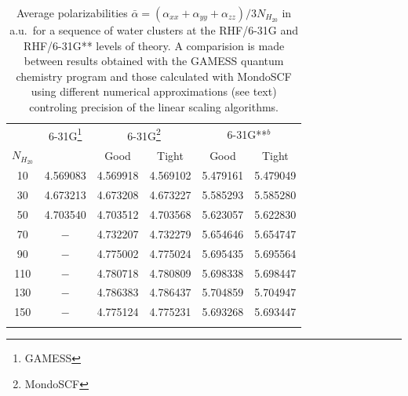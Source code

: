 \documentclass[prl,aps,twocolumn,showpacs,twocolumngrid,superbib]{revtex4}
\begin{document}
\begin{table}[t]
\caption{\protect Average polarizabilities $\bar{\alpha}=(\alpha_{xx}+\alpha_{yy}+\alpha_{zz})/3N_{H_20}$
         in a.u.~for a sequence of water clusters at the RHF/6-31G and RHF/6-31G** levels of theory.
         A comparision is made between results obtained with the GAMESS quantum chemistry program
         \cite{gamess} and those calculated with MondoSCF using different numerical approximations
         (see text) controling precision of the linear scaling algorithms.}\label{tab:Polari_Values}
\begin{tabular}{cccccc}
\toprule 
      &\multicolumn{1}{c}{6-31G\footnote[1]{GAMESS}}
      &\multicolumn{2}{c}{6-31G\footnote[2]{MondoSCF}}
      &\multicolumn{2}{c}{6-31G**$^b$}\\
      $N_{H_20}$ &          & Good     & Tight    &  Good    & Tight   \\
      \hline
      10  & 4.569083 & 4.569918 & 4.569102 & 5.479161 & 5.479049  \\
      30  & 4.673213 & 4.673208 & 4.673227 & 5.585293 & 5.585280  \\
      50  & 4.703540 & 4.703512 & 4.703568 & 5.623057 & 5.622830  \\
      70  & $-$      & 4.732207 & 4.732279 & 5.654646 & 5.654747  \\
      90  & $-$      & 4.775002 & 4.775024 & 5.695435 & 5.695564  \\
      110 & $-$      & 4.780718 & 4.780809 & 5.698338 & 5.698447  \\
      130 & $-$      & 4.786383 & 4.786437 & 5.704859 & 5.704947  \\
      150 & $-$      & 4.775124 & 4.775231 & 5.693268 & 5.693447  \\
\botrule
\end{tabular}
\end{table}
\end{document}
